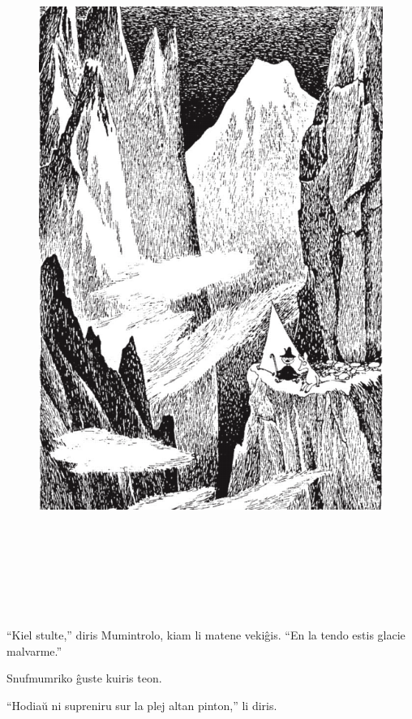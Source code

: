 \begin{figure}[htbp]
\centering
\includegraphics[width=450pt,height=655pt]{4-1.png}
\caption{}
\label{4-1}
\end{figure}

\noindent ``Kiel stulte,'' diris Mumintrolo, kiam li matene vekiĝis. ``En la tendo estis glacie malvarme.''

Snufmumriko ĝuste kuiris teon.

``Hodiaŭ ni supreniru sur la plej altan pinton,'' li diris.

